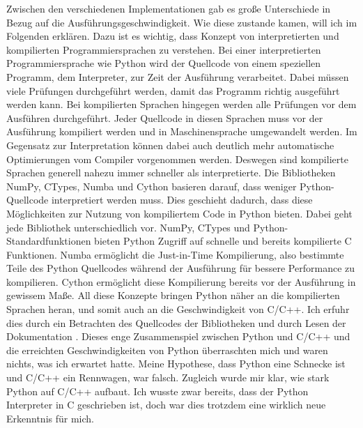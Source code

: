 \documentclass[11pt,a4paper]{article}
\begin{document}
Zwischen den verschiedenen Implementationen gab es große Unterschiede in Bezug auf die
Ausführungsgeschwindigkeit. Wie diese zustande kamen, will ich im Folgenden erklären.
Dazu ist es wichtig, dass Konzept von interpretierten und kompilierten
Programmiersprachen zu verstehen. Bei einer interpretierten Programmiersprache wie
Python wird der Quellcode von einem speziellen Programm, dem Interpreter, zur Zeit der Ausführung verarbeitet.
Dabei müssen viele Prüfungen durchgeführt werden, damit das Programm richtig ausgeführt werden kann.
Bei kompilierten Sprachen hingegen werden alle Prüfungen vor dem Ausführen durchgeführt.
Jeder Quellcode in diesen Sprachen muss vor der Ausführung kompiliert werden und in
Maschinensprache umgewandelt werden. Im Gegensatz zur Interpretation können dabei auch deutlich
mehr automatische Optimierungen vom Compiler vorgenommen werden.
Deswegen sind kompilierte Sprachen generell nahezu immer schneller als interpretierte.
Die Bibliotheken NumPy, CTypes, Numba und Cython basieren darauf, dass weniger Python-Quellcode
interpretiert werden muss. Dies geschieht dadurch, dass diese Möglichkeiten zur
Nutzung von kompiliertem Code in Python bieten.
Dabei geht jede Bibliothek unterschiedlich vor.
NumPy, CTypes und Python-Standardfunktionen bieten Python Zugriff auf schnelle und
bereits kompilierte C Funktionen.
Numba ermöglicht die Just-in-Time Kompilierung, also bestimmte Teile des Python Quellcodes
während der Ausführung für bessere Performance zu kompilieren.
Cython ermöglicht diese Kompilierung bereits vor der Ausführung in gewissem Maße.
All diese Konzepte bringen Python näher an die kompilierten Sprachen heran, und somit
auch an die Geschwindigkeit von C/C++. Ich erfuhr dies durch ein Betrachten des Quellcodes
der Bibliotheken und durch Lesen der Dokumentation \cite{pythonsource}
\cite{cythondocsnumpy} \cite{numbadoc} \cite{numpysource}.
Dieses enge Zusammenspiel zwischen Python und C/C++ und die erreichten Geschwindigkeiten
von Python überraschten mich und waren nichts, was ich erwartet hatte. Meine Hypothese,
dass Python eine Schnecke ist und C/C++ ein Rennwagen, war falsch.
Zugleich wurde mir klar, wie stark Python auf C/C++ aufbaut. Ich wusste zwar bereits,
dass der Python Interpreter in C geschrieben ist, doch war dies trotzdem eine wirklich
neue Erkenntnis für mich.
\end{document}
